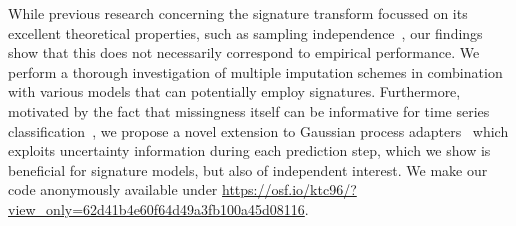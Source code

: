 \documentclass{article}
\begin{document}
While previous research concerning the signature transform
focussed on its excellent theoretical properties, such as sampling
independence~\citep[Proposition A.7]{kidger2019deep}, our findings show
that this does not
necessarily correspond to empirical performance.
%
We perform a thorough investigation of multiple imputation schemes in combination with various models that can potentially employ signatures.
Furthermore, motivated by the fact that missingness itself can be
informative for time series classification~\citep{rubin1976inference}, we propose a novel extension to Gaussian process adapters~\citep{li2016scalable} which exploits uncertainty information during each prediction step, which we show is beneficial for signature models, but also of independent interest.
%
%
%
We make our code anonymously available under \url{https://osf.io/ktc96/?view_only=62d41b4e60f64d49a3fb100a45d08116}.



\end{document}
